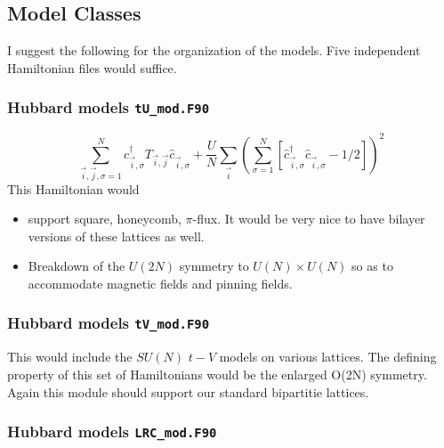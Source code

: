 \subsection{  Model Classes }

I suggest the following for the organization of the models.    Five independent Hamiltonian   files would suffice.


\subsubsection{Hubbard models   \texttt{tU\_mod.F90}}

\begin{equation}
    \sum_{\vec{i},\vec{j},\sigma=1}^{N}  \hat{c}^{\dagger}_{\vec{i},\sigma } T_{\vec{i},\vec{j}} \hat{c}^{\phantom\dagger}_{\vec{i},\sigma }     +  \frac{U}{N} \sum_{\vec{i}} \left(\sum_{\sigma=1}^{N}  \left[   \hat{c}^{\dagger}_{\vec{i},\sigma } 
    \hat{c}^{\phantom\dagger}_{\vec{i},\sigma }  - 1/2  \right] \right)^2 
\end{equation}
This Hamiltonian would
\begin{itemize} 
\item support   square,  honeycomb,  $\pi$-flux.  It would be very nice to have bilayer versions of these lattices as well. 
\item Breakdown of the $U(2N)$ symmetry to $U(N) \times U(N)$ so as to accommodate magnetic fields and pinning fields.  
\end{itemize}


\subsubsection{Hubbard models   \texttt{tV\_mod.F90}}

This would include the $SU(N)$  $t-V$ models on various lattices.  The defining property of this set of Hamiltonians would be the enlarged O(2N) symmetry.  Again  this   module should support our standard bipartitie lattices. 


\subsubsection{Hubbard models   \texttt{LRC\_mod.F90}}

